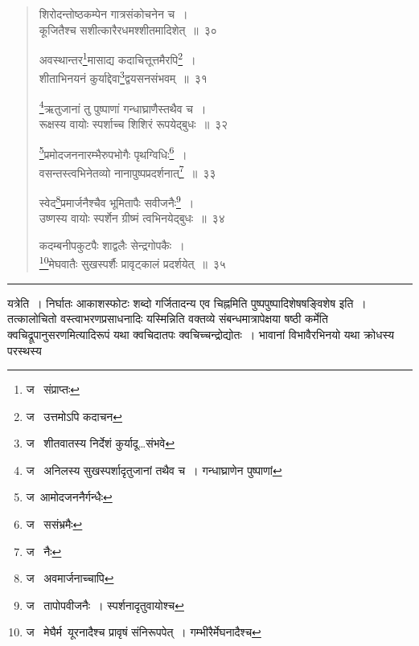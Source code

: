 \documentclass[11pt, openany]{book}
\begin{document}
\begin{quote}
{\na शिरोदन्तोष्ठकम्पेन गात्रसंकोचनेन च~।\\
कूजितैश्च सशीत्कारैरधमश्शीतमादिशेत्~॥~३०

अवस्थान्तर\renewcommand{\thefootnote}{1}\footnote{ज \textendash\  संप्राप्तः}मासाद्य कदाचित्तूत्तमैरपि\renewcommand{\thefootnote}{2}\footnote{ज \textendash\  उत्तमोऽपि कदाचन}~।\\
शीताभिनयनं कुर्याद्देवा\renewcommand{\thefootnote}{3}\footnote{ज \textendash\  शीतवातस्य निर्देशं कुर्यादू\ldots संभवे}द्वयसनसंभवम्~॥~३१

\renewcommand{\thefootnote}{4}\footnote{ज \textendash\  अनिलस्य सुखस्पर्शादृतुजानां तथैव च~। गन्धाघ्राणेन पुष्पाणां}ऋतुजानां तु पुष्पाणां गन्धाघ्राणैस्तथैव च~।\\
रूक्षस्य वायोः स्पर्शाच्च शिशिरं रूपयेद्बुधः~॥~३२

\renewcommand{\thefootnote}{5}\footnote{ज\textendash\  आमोदजननैर्गन्धैः}प्रमोदजननारम्भैरुपभोगैः पृथग्विधिः\renewcommand{\thefootnote}{6}\footnote{ज \textendash\  ससंभ्रमैः}~।\\
वसन्तस्त्वभिनेतव्यो नानापुष्पप्रदर्शनात्\renewcommand{\thefootnote}{7}\footnote{ज \textendash\  नैः}~॥~३३

स्वेद\renewcommand{\thefootnote}{8}\footnote{ज \textendash\  अवमार्जनाच्चापि}प्रमार्जनैश्चैव भूमितापैः सवीजनैः\renewcommand{\thefootnote}{9}\footnote{ज \textendash\  तापोपवीजनैः~। स्पर्शनादृतुवायोश्च}~।\\
उष्णस्य वायोः स्पर्शेन ग्रीष्मं त्वभिनयेद्बुधः~॥~३४

कदम्बनीपकुटपैः शाद्वलैः सेन्द्रगोपकैः~।\\
\renewcommand{\thefootnote}{10}\footnote{ज \textendash\  मेघैर्म\textendash\ यूरनादैश्च प्रावृषं संनिरूपपेत्~। गम्भीरैर्मेघनादैश्च}मेघवातैः सुखस्पर्शैः प्रावृट्कालं प्रदर्शयेत्~॥~३५}
\end{quote}

\hrule

\vspace{2mm}
\noindent
यत्रेति~। निर्घातः आकाशस्फोटः शब्दो गर्जितादन्य एव चिह्नमिति पुष्पपुष्पादिशेषषङ्विशेष इति~। तत्कालोचितो वस्त्वाभरणप्रसाधनादिः यस्मिन्निति वक्तव्ये संबन्धमात्रापेक्षया षष्ठी कर्मेति क्वचिद्रूपानुसरणमित्यादिरूपं यथा क्वचिदातपः क्वचिच्चन्द्रोद्योतः~। भावानां विभावैरभिनयो यथा क्रोधस्य परस्थस्य

\newpage
\end{document}
